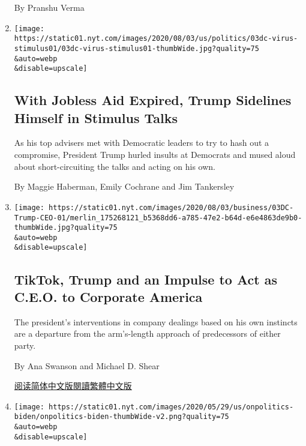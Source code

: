 \begin{enumerate}
  By Pranshu Verma
\item
  \href{/2020/08/03/us/politics/congress-jobless-aid-talks-trump.html}{}

  \texttt{[image: https://static01.nyt.com/images/2020/08/03/us/politics/03dc-virus-stimulus01/03dc-virus-stimulus01-thumbWide.jpg?quality=75\\\&auto=webp\\\&disable=upscale]}

  \hypertarget{with-jobless-aid-expired-trump-sidelines-himself-in-stimulus-talks-1}{%
  \subsection{With Jobless Aid Expired, Trump Sidelines Himself in
  Stimulus
  Talks}\label{with-jobless-aid-expired-trump-sidelines-himself-in-stimulus-talks-1}}

  As his top advisers met with Democratic leaders to try to hash out a
  compromise, President Trump hurled insults at Democrats and mused
  aloud about short-circuiting the talks and acting on his own.

  By Maggie Haberman, Emily Cochrane and Jim Tankersley
\item
  \href{/2020/08/03/business/economy/trump-tiktok-china-business.html}{}

  \texttt{[image: https://static01.nyt.com/images/2020/08/03/business/03DC-Trump-CEO-01/merlin\_175268121\_b5368dd6-a785-47e2-b64d-e6e4863de9b0-thumbWide.jpg?quality=75\\\&auto=webp\\\&disable=upscale]}

  \hypertarget{tiktok-trump-and-an-impulse-to-act-as-ceo-to-corporate-america}{%
  \subsection{TikTok, Trump and an Impulse to Act as C.E.O. to Corporate
  America}\label{tiktok-trump-and-an-impulse-to-act-as-ceo-to-corporate-america}}

  The president's interventions in company dealings based on his own
  instincts are a departure from the arm's-length approach of
  predecessors of either party.

  By Ana Swanson and Michael D. Shear

  \href{https://cn.nytimes.com/business/20200804/trump-tiktok-china-business/}{阅读简体中文版}\href{https://cn.nytimes.com/business/20200804/trump-tiktok-china-business/zh-hant/}{閱讀繁體中文版}
\item
  \href{/2020/08/03/us/politics/joe-biden-vp.html}{}

  \texttt{[image: https://static01.nyt.com/images/2020/05/29/us/onpolitics-biden/onpolitics-biden-thumbWide-v2.png?quality=75\\\&auto=webp\\\&disable=upscale]}


\end{enumerate}
